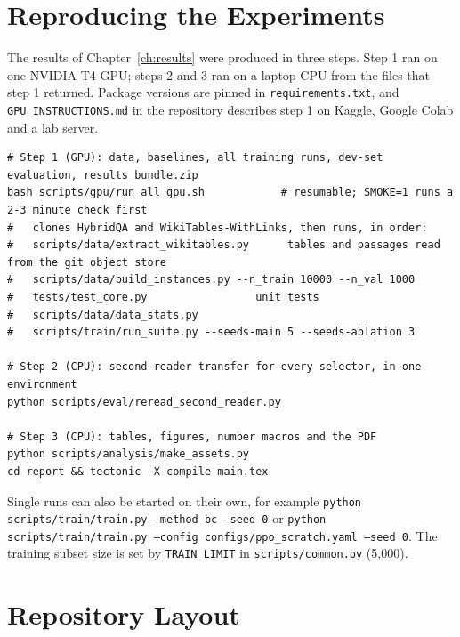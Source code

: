 \chapter{Reproducing the Experiments}
\label{app:repro}

The results of Chapter~\ref{ch:results} were produced in three steps. Step 1 ran on one NVIDIA T4 GPU; steps 2 and 3 ran on a laptop CPU from the files that step 1 returned. Package versions are pinned in \texttt{requirements.txt}, and \texttt{GPU\_INSTRUCTIONS.md} in the repository describes step 1 on Kaggle, Google Colab and a lab server.

\begin{footnotesize}
\begin{verbatim}
# Step 1 (GPU): data, baselines, all training runs, dev-set evaluation, results_bundle.zip
bash scripts/gpu/run_all_gpu.sh            # resumable; SMOKE=1 runs a 2-3 minute check first
#   clones HybridQA and WikiTables-WithLinks, then runs, in order:
#   scripts/data/extract_wikitables.py      tables and passages read from the git object store
#   scripts/data/build_instances.py --n_train 10000 --n_val 1000
#   tests/test_core.py                 unit tests
#   scripts/data/data_stats.py
#   scripts/train/run_suite.py --seeds-main 5 --seeds-ablation 3

# Step 2 (CPU): second-reader transfer for every selector, in one environment
python scripts/eval/reread_second_reader.py

# Step 3 (CPU): tables, figures, number macros and the PDF
python scripts/analysis/make_assets.py
cd report && tectonic -X compile main.tex
\end{verbatim}
\end{footnotesize}

Single runs can also be started on their own, for example \texttt{python scripts/train/train.py --method bc --seed 0} or \texttt{python scripts/train/train.py --config configs/ppo\_scratch.yaml --seed 0}. The training subset size is set by \texttt{TRAIN\_LIMIT} in \texttt{scripts/common.py} (5{,}000).

\chapter{Repository Layout}
\label{app:layout}

